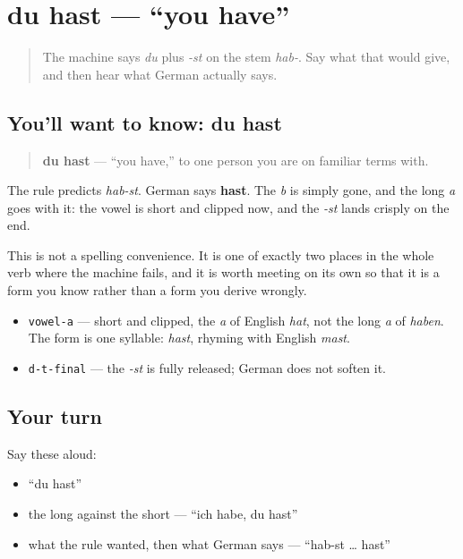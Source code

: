 \section[du hast]{du hast — \textquotedblleft{}you have\textquotedblright{}}

\label{lesson:GE-C14-du-hast}



\begin{quote}
The machine says \emph{du} plus \emph{-st} on the stem \emph{hab-}. Say what that would give, and then hear what German actually says.
\end{quote}

\subsection*{You'll want to know: du hast}
\begin{quote}
\textbf{du hast} — \textquotedblleft{}you have,\textquotedblright{} to one person you are on familiar terms with.
\end{quote}

The rule predicts \emph{hab-st}. German says \textbf{hast}. The \emph{b} is simply gone, and the long \emph{a} goes with it: the vowel is short and clipped now, and the \emph{-st} lands crisply on the end.

This is not a spelling convenience. It is one of exactly two places in the whole verb where the machine fails, and it is worth meeting on its own so that it is a form you know rather than a form you derive wrongly.

\begin{sounds}
\begin{itemize}
\raggedright
  \item \texttt{vowel-a} — short and clipped, the \emph{a} of English \emph{hat}, not the long \emph{a} of \emph{haben}. The form is one syllable: \emph{hast}, rhyming with English \emph{mast}.
  \item \texttt{d-t-final} — the \emph{-st} is fully released; German does not soften it.
\end{itemize}
\end{sounds}

\subsection*{Your turn}
Say these aloud:

\begin{itemize}
\raggedright
  \item \textquotedblleft{}du hast\textquotedblright{}
  \item the long against the short — \textquotedblleft{}ich habe, du hast\textquotedblright{}
  \item what the rule wanted, then what German says — \textquotedblleft{}hab-st … hast\textquotedblright{}
\end{itemize}

